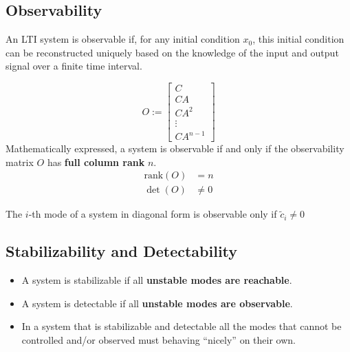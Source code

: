 
\subsection{Observability}

An LTI system is observable if, for any initial condition $x_0$, this initial condition can be reconstructed uniquely based on the knowledge of the input and output signal over a finite time interval.

\begin{equation*}
    O:= \begin{bmatrix}
        C      \\
        CA     \\
        CA^2   \\
        \vdots \\
        CA^{n-1}
    \end{bmatrix}
\end{equation*}
Mathematically expressed, a system is observable if and only if the observability matrix $O$ has \textbf{full column rank} $n$.
\begin{align*}
    \text{rank}(O) & = n    \\
    \det(O)        & \neq 0
\end{align*}


The $i$-th mode of a system in diagonal form is observable only if $\tilde{c}_i \neq 0$

\subsection{Stabilizability and Detectability}
\begin{itemize}
    \item A system is stabilizable if all \textbf{unstable modes are reachable}.
    \item A system is detectable if all \textbf{unstable modes are observable}.
    \item In a system that is stabilizable and detectable all the modes that cannot be controlled and/or observed must behaving ``nicely'' on their own.
\end{itemize}

